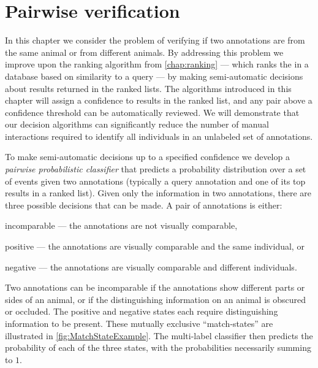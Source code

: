 
\begin{comment}
fixtex --reformat --fpaths chapter4-pairclf.tex --print
fixtex --fpaths chapter4-pairclf.tex --outline --asmarkdown --numlines=999 

fixtex --fpaths chapter4-pairclf.tex --outline --asmarkdown --numlines=999 --shortcite -w && ./checklang.py outline_chapter4-pairclf.md
https://www.languagetool.org/
\end{comment}

\newcommand{\nan}{\text{nan}}

\chapter{Pairwise verification}\label{chap:pairclf}

In this chapter we consider the problem of verifying if two annotations are from the same animal or from different
animals. By addressing this problem we improve upon the ranking algorithm from \cref{chap:ranking} --- which ranks
the \names{} in a database based on similarity to a query --- by making semi-automatic decisions about results
returned in the ranked lists. The algorithms introduced in this chapter will assign a confidence to results in the
ranked list, and any pair above a confidence threshold can be automatically reviewed. We will demonstrate that our
decision algorithms can significantly reduce the number of manual interactions required to identify all individuals
in an unlabeled set of annotations.

To make semi-automatic decisions up to a specified confidence we develop a \emph{pairwise probabilistic
  classifier} that predicts a probability distribution over a set of events given two annotations (typically a
  query annotation and one of its top results in a ranked list).
Given only the information in two annotations,  there are three possible decisions that can be made.
A pair of annotations is either:
\begin{enumln}
    \item incomparable --- the annotations are not visually comparable,

    \item positive --- the annotations are visually comparable and the same individual, or

    \item negative --- the annotations are visually comparable and different individuals.
\end{enumln}
Two annotations can be incomparable if the annotations show different parts or sides of an animal, or if the
  distinguishing information on an animal is obscured or occluded.
The positive and negative states each require distinguishing information to be present.
These mutually exclusive ``match-states'' are illustrated in \cref{fig:MatchStateExample}.
The multi-label classifier then predicts the probability of each of the three states, with the probabilities
  necessarily summing to $1$.

